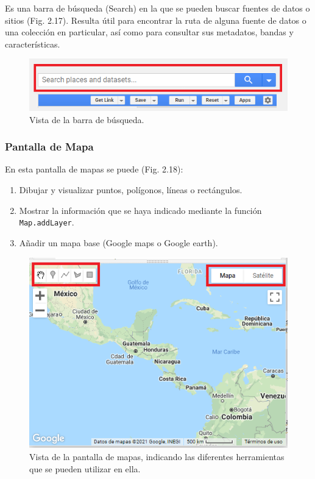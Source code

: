 \documentclass[
  12pt,
  letterpaper,
  twoside]{book}
\providecommand{\tightlist}{%
  \setlength{\itemsep}{0pt}\setlength{\parskip}{0pt}}
\begin{document}
Es una barra de búsqueda (Search) en la que se pueden buscar fuentes de datos o sitios (Fig. 2.17). Resulta útil para encontrar la ruta de alguna fuente de datos o una colección en particular, así como para consultar sus metadatos, bandas y características.

\begin{figure}[btp]

{\centering \includegraphics[width=0.8\linewidth]{Img/search} 

}

\caption{Vista de la barra de búsqueda.}\label{fig:unnamed-chunk-18}
\end{figure}

\hypertarget{pantalla-de-mapa}{%
\subsubsection*{Pantalla de Mapa}\label{pantalla-de-mapa}}

En esta pantalla de mapas se puede (Fig. 2.18):

\begin{enumerate}
\def\labelenumi{\arabic{enumi}.}
\tightlist
\item
  Dibujar y visualizar puntos, polígonos, líneas o rectángulos.
\item
  Mostrar la información que se haya indicado mediante la función \texttt{Map.addLayer}.
\item
  Añadir un mapa base (Google maps o Google earth).
\end{enumerate}

\begin{figure}[btp]

{\centering \includegraphics[width=0.8\linewidth]{Img/drawing} 

}

\caption{Vista de la pantalla de mapas, indicando las diferentes herramientas que se pueden utilizar en ella.}\label{fig:unnamed-chunk-19}
\end{figure}
\end{document}
